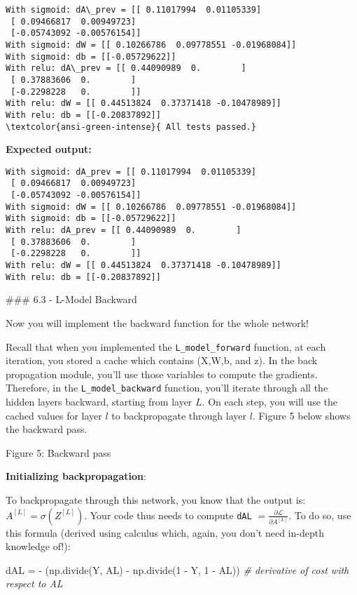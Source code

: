 \documentclass[11pt]{article}
\newenvironment{Shaded}{}{}
\newcommand{\DecValTok}[1]{\textcolor[rgb]{0.25,0.63,0.44}{{#1}}}
\newcommand{\CommentTok}[1]{\textcolor[rgb]{0.38,0.63,0.69}{\textit{{#1}}}}
\newcommand{\NormalTok}[1]{{#1}}
\newcommand{\OperatorTok}[1]{\textcolor[rgb]{0.40,0.40,0.40}{{#1}}}
\begin{document}
    \begin{Verbatim}[commandchars=\\\{\}]
With sigmoid: dA\_prev = [[ 0.11017994  0.01105339]
 [ 0.09466817  0.00949723]
 [-0.05743092 -0.00576154]]
With sigmoid: dW = [[ 0.10266786  0.09778551 -0.01968084]]
With sigmoid: db = [[-0.05729622]]
With relu: dA\_prev = [[ 0.44090989  0.        ]
 [ 0.37883606  0.        ]
 [-0.2298228   0.        ]]
With relu: dW = [[ 0.44513824  0.37371418 -0.10478989]]
With relu: db = [[-0.20837892]]
\textcolor{ansi-green-intense}{ All tests passed.}
    \end{Verbatim}

    \textbf{Expected output:}

\begin{verbatim}
With sigmoid: dA_prev = [[ 0.11017994  0.01105339]
 [ 0.09466817  0.00949723]
 [-0.05743092 -0.00576154]]
With sigmoid: dW = [[ 0.10266786  0.09778551 -0.01968084]]
With sigmoid: db = [[-0.05729622]]
With relu: dA_prev = [[ 0.44090989  0.        ]
 [ 0.37883606  0.        ]
 [-0.2298228   0.        ]]
With relu: dW = [[ 0.44513824  0.37371418 -0.10478989]]
With relu: db = [[-0.20837892]]
\end{verbatim}

    \#\#\# 6.3 - L-Model Backward

Now you will implement the backward function for the whole network!

Recall that when you implemented the \texttt{L\_model\_forward}
function, at each iteration, you stored a cache which contains (X,W,b,
and z). In the back propagation module, you'll use those variables to
compute the gradients. Therefore, in the \texttt{L\_model\_backward}
function, you'll iterate through all the hidden layers backward,
starting from layer \(L\). On each step, you will use the cached values
for layer \(l\) to backpropagate through layer \(l\). Figure 5 below
shows the backward pass.

Figure 5: Backward pass

\textbf{Initializing backpropagation}:

To backpropagate through this network, you know that the output is:
\(A^{[L]} = \sigma(Z^{[L]})\). Your code thus needs to compute
\texttt{dAL} \(= \frac{\partial \mathcal{L}}{\partial A^{[L]}}\). To do
so, use this formula (derived using calculus which, again, you don't
need in-depth knowledge of!):

\begin{Shaded}
\begin{Highlighting}[]
\NormalTok{dAL }\OperatorTok{=} \OperatorTok{{-}}\NormalTok{ (np.divide(Y, AL) }\OperatorTok{{-}}\NormalTok{ np.divide(}\DecValTok{1} \OperatorTok{{-}}\NormalTok{ Y, }\DecValTok{1} \OperatorTok{{-}}\NormalTok{ AL)) }\CommentTok{\# derivative of cost with respect to AL}
\end{Highlighting}
\end{Shaded}
\end{document}
